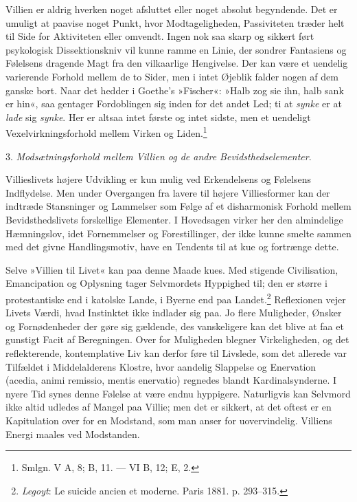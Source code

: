 \documentclass[12pt,a4paper,openany]{book}
\newcommand{\opage}[1]{\marginnote{\footnotesize\textit{[#1]}}}
\begin{document}
Villien er aldrig hverken noget afsluttet eller noget absolut
begyndende. Det er umuligt at paavise noget Punkt, hvor Modtageligheden,
Passiviteten træder helt til Side for Aktiviteten eller omvendt. Ingen
nok saa skarp og sikkert ført psykologisk Dissektionskniv vil kunne
ramme en Linie, der sondrer Fantasiens og Følelsens dragende Magt fra
den vilkaarlige Hengivelse. Der kan være et uendelig varierende Forhold
mellem de to Sider, men i intet Øjeblik falder nogen af dem ganske bort.
Naar det hedder i Goethe’s »Fischer«: »Halb zog sie ihn, halb sank er
hin«, saa gentager Fordoblingen sig inden for det andet Led; ti at
\emph{synke} er at \emph{lade} sig \emph{synke}. Her er altsaa intet
første og intet sidste, men et uendeligt Vexelvirkningsforhold mellem
Virken og Liden.\footnote[1]{Smlgn. V A, 8; B, 11. --- VI B, 12; E, 2.}

3. \emph{Modsætningsforhold mellem Villien og de andre
Bevidsthedselementer}.

Villieslivets højere Udvikling er kun mulig ved Erkendelsens og
Følelsens Indflydelse. Men under Overgangen fra lavere til højere
Villiesformer kan der indtræde Stansninger og Lammelser som Følge af et
disharmonisk Forhold mellem Bevidsthedslivets forskellige Elementer. I
Hovedsagen virker her den almindelige Hæmningslov, idet Fornemmelser og
Forestillinger, der ikke kunne smelte sammen med det givne
Handlingsmotiv, have en Tendents til at kue og fortrænge dette.

Selve »Villien til Livet« kan paa denne Maade kues. Med stigende
Civilisation, Emancipation og Oplysning tager Selvmordets Hyppighed til;
den er større i protestantiske end i katolske Lande, i Byerne end paa
Landet.\footnote[2]{\emph{Legoyt}: Le suicide ancien et moderne. Paris
1881. p. 293--315.} Reflexionen vejer Livets Værdi, hvad Instinktet ikke
indlader sig paa. Jo flere Muligheder, Ønsker og Fornødenheder der gøre
sig gældende, des vanskeligere kan det blive at faa et gunstigt Facit af
Beregningen. Over for Muligheden blegner Virkeligheden, og det
reflekterende, kontemplative Liv kan derfor føre til Livslede,
\opage{392}som det allerede var Tilfældet i Middelalderens Klostre, hvor
aandelig Slappelse og Enervation (acedia, animi remissio, mentis
enervatio) regnedes blandt Kardinalsynderne. I nyere Tid synes denne
Følelse at være endnu hyppigere. Naturligvis kan Selvmord ikke altid
udledes af Mangel paa Villie; men det er sikkert, at det oftest er en
Kapitulation over for en Modstand, som man anser for uovervindelig.
Villiens Energi maales ved Modstanden.
\end{document}
